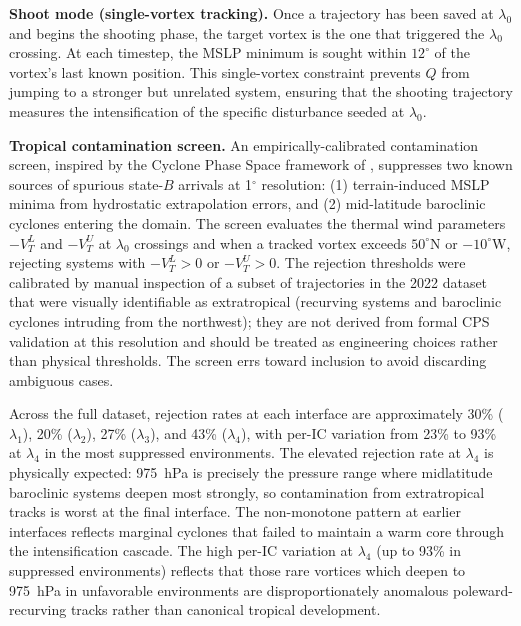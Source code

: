 \documentclass[11pt]{article}
\begin{document}
\textbf{Shoot mode (single-vortex tracking).}
Once a trajectory has been saved at $\lambda_0$ and begins the shooting phase, the
target vortex is the one that triggered the $\lambda_0$ crossing.  At each timestep,
the MSLP minimum is sought within $12^\circ$ of the vortex's last known position.
This single-vortex constraint prevents $Q$ from jumping to a stronger but unrelated
system, ensuring that the shooting trajectory measures the intensification of the
specific disturbance seeded at $\lambda_0$.

\textbf{Tropical contamination screen.}
An empirically-calibrated contamination screen, inspired by the Cyclone Phase Space
framework of \citet{hart2003cyclone}, suppresses two known sources of spurious
state-$B$ arrivals at 1$^\circ$ resolution: (1) terrain-induced MSLP minima from
hydrostatic extrapolation errors, and (2) mid-latitude baroclinic cyclones entering
the domain. The screen evaluates the thermal wind parameters $-V_T^L$ and $-V_T^U$
at $\lambda_0$ crossings and when a tracked vortex exceeds $50^\circ$N or $-10^\circ$W,
rejecting systems with $-V_T^L > 0$ or $-V_T^U > 0$. The rejection thresholds were
calibrated by manual inspection of a subset of trajectories in the 2022 dataset that
were visually identifiable as extratropical (recurving systems and baroclinic cyclones
intruding from the northwest); they are not derived from formal CPS validation at this
resolution and should be treated as engineering choices rather than physical thresholds.
The screen errs toward inclusion to avoid discarding ambiguous cases.

Across the full dataset, rejection rates at each interface are approximately
30\% ($\lambda_1$), 20\% ($\lambda_2$), 27\% ($\lambda_3$), and 43\% ($\lambda_4$),
with per-IC variation from 23\% to 93\% at $\lambda_4$ in the most suppressed environments.
The elevated rejection rate at $\lambda_4$ is physically expected: 975~hPa is precisely
the pressure range where midlatitude baroclinic systems deepen most strongly, so
contamination from extratropical tracks is worst at the final interface.
The non-monotone pattern at earlier interfaces reflects marginal cyclones that failed
to maintain a warm core through the intensification cascade.
The high per-IC variation at $\lambda_4$ (up to 93\% in suppressed environments)
reflects that those rare vortices which deepen to 975~hPa in unfavorable environments
are disproportionately anomalous poleward-recurving tracks rather than canonical
tropical development.
\end{document}
